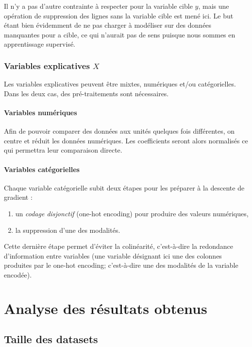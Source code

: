 \documentclass[10pt,french]{report}
\begin{document}
	Il n'y a pas d'autre contrainte à respecter pour la variable cible $y$, mais une opération de suppression des lignes sans la variable cible est mené ici. Le but étant bien évidemment de ne pas charger à modéliser sur des données manquantes pour a cible, ce qui n'aurait pas de sens puisque nous sommes en apprentissage supervisé.

	\subsection{Variables explicatives $X$}

	Les variables explicatives peuvent être mixtes, numériques et/ou catégorielles. Dans les deux cas, des pré-traitements sont nécessaires.

	\subsubsection{Variables numériques}

	Afin de pouvoir comparer des données aux unités quelques fois différentes, on centre et réduit les données numériques. Les coefficients seront alors normalisés ce qui permettra leur comparaison directe.

	\subsubsection{Variables catégorielles}

	Chaque variable catégorielle subit deux étapes pour les préparer à la descente de gradient :

	\begin{enumerate}
		\item un \textit{codage disjonctif} (one-hot encoding) pour produire des valeurs numériques,
		\item la suppression d'une des modalités.
	\end{enumerate}

	Cette dernière étape permet d'éviter la colinéarité, c'est-à-dire la redondance d'information entre variables (une variable désignant ici une des colonnes produites par le one-hot encoding; c'est-à-dire une des modalités de la variable encodée).

    \chapter{Analyse des résultats obtenus}

    \section{Taille des datasets}
\end{document}
